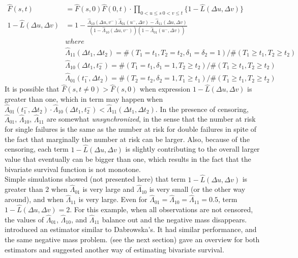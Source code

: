 \documentclass[]{article}
\begin{document}
	$$
	\begin{aligned}
		\hat{F}(s,t) &= \hat{F}(s,0)\hat{F}(0,t)\cdot \prod_{{0<u\leq s~0<v\leq t}}\{1 - \hat{L}(\Delta u, \Delta v)\}\\
    1 - \hat{L}(\Delta u, \Delta v) &= 1 - \frac{\hat{\Lambda}_{10}(\Delta u,v^-)\hat{\Lambda}_{01}(u^-,\Delta v) - \hat{\Lambda}_{11}(\Delta u,\Delta v)}{\left(1-\hat{\Lambda}_{10}(\Delta u,v^-)\right)\left(1-\hat{\Lambda}_{01}(u^-,\Delta v)\right)}\\
  &where\\
	&\hat{\Lambda}_{11}(\Delta t_1, \Delta t_2) = \#(T_1=t_1, T_2=t_2, \delta_1=\delta_2=1)/\#(T_1\geq t_1, T_2\geq t_2)\\
	&\hat{\Lambda}_{10}(\Delta t_1, t_2^-) = \#(T_1=t_1, \delta_1=1, T_2\geq t_2)/\#(T_1\geq t_1, T_2\geq t_2)\\
	&\hat{\Lambda}_{01}(t_1^-,\Delta  t_2) = \#(T_2=t_2, \delta_2=1, T_1\geq t_1)/\#(T_1\geq t_1, T_2\geq t_2)
	\end{aligned}
	$$
It is possible that $\hat{F}(s,t\neq 0) > \hat{F}(s,0)$ when expression $1 - \hat{L}(\Delta u, \Delta v)$ is greater than one, which in term may happen when  $\hat{\Lambda}_{01}(t_1^-,\Delta  t_2) \cdot \hat{\Lambda}_{10}(\Delta t_1, t_2^-)< \hat{\Lambda}_{11}(\Delta t_1, \Delta t_2)$. In the presence of censoring, $\hat{\Lambda}_{01}$, $\hat{\Lambda}_{10}$, $\hat{\Lambda}_{11}$ are somewhat \emph{unsynchronized}, in the sense that the number at risk for single failures is the same as the number at risk for double failures in spite of the fact that marginally the number at risk can be larger. Also, because of the censoring, each term $1 - \hat{L}(\Delta u, \Delta v)$ is slightly contributing to the overall larger value that eventually can be bigger than one, which results in the fact that the bivariate survival function is not monotone.\\
Simple simulations showed (not presented here) that term $1 - \hat{L}(\Delta u, \Delta v)$ is greater than $2$ when $\hat{\Lambda}_{01}$ is very large and $\hat{\Lambda}_{10}$ is very small (or the other way around), and when $\hat{\Lambda}_{11}$ is very large. Even for $\hat{\Lambda}_{01} = \hat{\Lambda}_{10} = \hat{\Lambda}_{11} = 0.5$, term $1 - \hat{L}(\Delta u, \Delta v) = 2$. For this  example, when all observations are not censored, the values of $\hat{\Lambda}_{01}$, $\hat{\Lambda}_{10}$, and $\hat{\Lambda}_{11}$ balance out and the negative mass disappears.
~\\

\cite{prentice1992covariance} introduced an estimator similar to Dabrowska's. It had similar performance, and the same negative mass problem. \cite{van1997nonparametric} (see the next section) gave an overview for both estimators and suggested another way of estimating bivariate survival.
\end{document}

